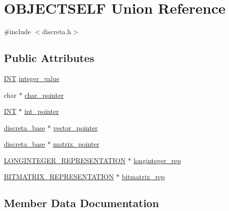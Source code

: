 \hypertarget{union_o_b_j_e_c_t_s_e_l_f}{}\section{O\+B\+J\+E\+C\+T\+S\+E\+LF Union Reference}
\label{union_o_b_j_e_c_t_s_e_l_f}


{\ttfamily \#include $<$discreta.\+h$>$}

\subsection*{Public Attributes}
\begin{DoxyCompactItemize}
\item 
\mbox{\hyperlink{galois_8h_a09fddde158a3a20bd2dcadb609de11dc}{I\+NT}} \mbox{\hyperlink{union_o_b_j_e_c_t_s_e_l_f_aa4dcdc7961db19581ca0e771120fb980}{integer\+\_\+value}}
\item 
char $\ast$ \mbox{\hyperlink{union_o_b_j_e_c_t_s_e_l_f_a8a925f4b4ecda237a456cf62b9f66df5}{char\+\_\+pointer}}
\item 
\mbox{\hyperlink{galois_8h_a09fddde158a3a20bd2dcadb609de11dc}{I\+NT}} $\ast$ \mbox{\hyperlink{union_o_b_j_e_c_t_s_e_l_f_a1fa0a8a6097b6d8d4d9222102bb21c9b}{int\+\_\+pointer}}
\item 
\mbox{\hyperlink{classdiscreta__base}{discreta\+\_\+base}} $\ast$ \mbox{\hyperlink{union_o_b_j_e_c_t_s_e_l_f_adb09ccbb248b3eba1768158b272d0a2c}{vector\+\_\+pointer}}
\item 
\mbox{\hyperlink{classdiscreta__base}{discreta\+\_\+base}} $\ast$ \mbox{\hyperlink{union_o_b_j_e_c_t_s_e_l_f_a006c9d74a94f2069da98def85ed4f8bb}{matrix\+\_\+pointer}}
\item 
\mbox{\hyperlink{discreta_8h_acfd8c2baf438bb4e79d8e8d4b0ca2b8e}{L\+O\+N\+G\+I\+N\+T\+E\+G\+E\+R\+\_\+\+R\+E\+P\+R\+E\+S\+E\+N\+T\+A\+T\+I\+ON}} $\ast$ \mbox{\hyperlink{union_o_b_j_e_c_t_s_e_l_f_ab86f9352eefd3b1f3831056f585e6c1c}{longinteger\+\_\+rep}}
\item 
\mbox{\hyperlink{discreta_8h_a17429cbb9b1cb0f60afa40bd29d7d8a3}{B\+I\+T\+M\+A\+T\+R\+I\+X\+\_\+\+R\+E\+P\+R\+E\+S\+E\+N\+T\+A\+T\+I\+ON}} $\ast$ \mbox{\hyperlink{union_o_b_j_e_c_t_s_e_l_f_a467933a86dd0332b76b462f7a2afdcba}{bitmatrix\+\_\+rep}}
\end{DoxyCompactItemize}


\subsection{Member Data Documentation}
\mbox{\label{union_o_b_j_e_c_t_s_e_l_f_a467933a86dd0332b76b462f7a2afdcba}} 
